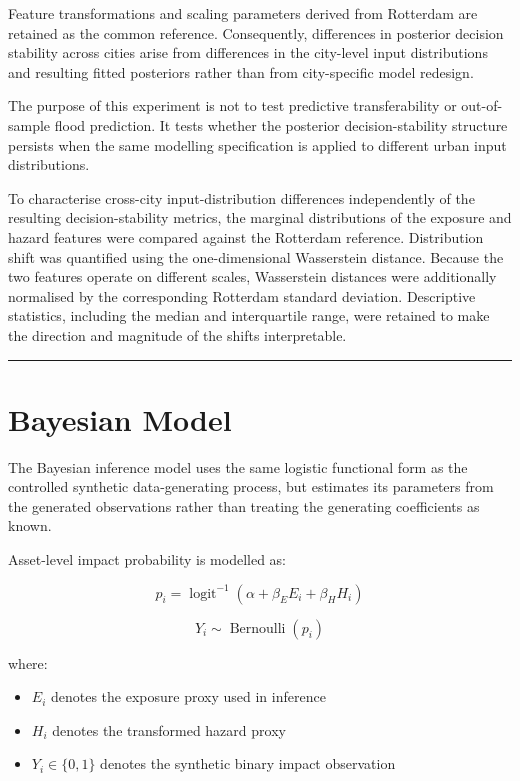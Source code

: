 \documentclass[
]{article}
\providecommand{\tightlist}{%
  \setlength{\itemsep}{0pt}\setlength{\parskip}{0pt}}
\begin{document}
Feature transformations and scaling parameters derived from Rotterdam
are retained as the common reference. Consequently, differences in
posterior decision stability across cities arise from differences in the
city-level input distributions and resulting fitted posteriors rather
than from city-specific model redesign.

The purpose of this experiment is not to test predictive transferability
or out-of-sample flood prediction. It tests whether the posterior
decision-stability structure persists when the same modelling
specification is applied to different urban input distributions.

To characterise cross-city input-distribution differences independently
of the resulting decision-stability metrics, the marginal distributions
of the exposure and hazard features were compared against the Rotterdam
reference. Distribution shift was quantified using the one-dimensional
Wasserstein distance. Because the two features operate on different
scales, Wasserstein distances were additionally normalised by the
corresponding Rotterdam standard deviation. Descriptive statistics,
including the median and interquartile range, were retained to make the
direction and magnitude of the shifts interpretable.

\begin{center}\rule{0.5\linewidth}{0.5pt}\end{center}

\section{Bayesian Model}\label{bayesian-model}

The Bayesian inference model uses the same logistic functional form as
the controlled synthetic data-generating process, but estimates its
parameters from the generated observations rather than treating the
generating coefficients as known.

Asset-level impact probability is modelled as:

\[
p_i =
\operatorname{logit}^{-1}
\left(
\alpha + \beta_E E_i + \beta_H H_i
\right)
\]

\[
Y_i \sim \operatorname{Bernoulli}(p_i)
\]

where:

\begin{itemize}
\tightlist
\item
  \(E_i\) denotes the exposure proxy used in inference
\item
  \(H_i\) denotes the transformed hazard proxy
\item
  \(Y_i \in \{0,1\}\) denotes the synthetic binary impact observation
\end{itemize}
\end{document}
